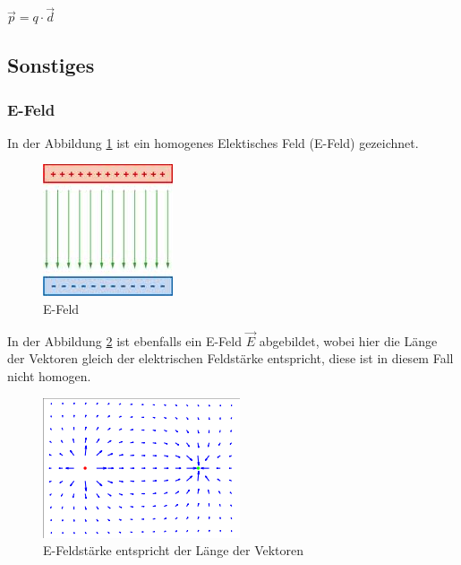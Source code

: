 \documentclass[a4paper]{scrartcl}
\begin{document}
$ \vec{p}=q\cdot\vec{d} $


\subsection{Sonstiges}



\subsubsection{E-Feld}

In der Abbildung \ref{fig:E-Feld} ist ein homogenes Elektisches Feld (E-Feld) gezeichnet.

\begin{figure}[h!]
\begin{center}
\includegraphics[scale=0.5]{images/E-Feld.jpg}
\caption{E-Feld}
\label{fig:E-Feld}
\end{center}
\end{figure}

In der Abbildung \ref{fig:E-Feldstaerke} ist ebenfalls ein E-Feld $ \vec{E} $ abgebildet, wobei hier die Länge der Vektoren gleich der elektrischen Feldstärke entspricht, diese ist in diesem Fall nicht homogen.

\begin{figure}[h!]
\begin{center}
\includegraphics[scale=0.5]{images/E-Feldstaerke.png}
\caption{E-Feldstärke entspricht der Länge der Vektoren}
\label{fig:E-Feldstaerke}
\end{center}
\end{figure}
\end{document}
